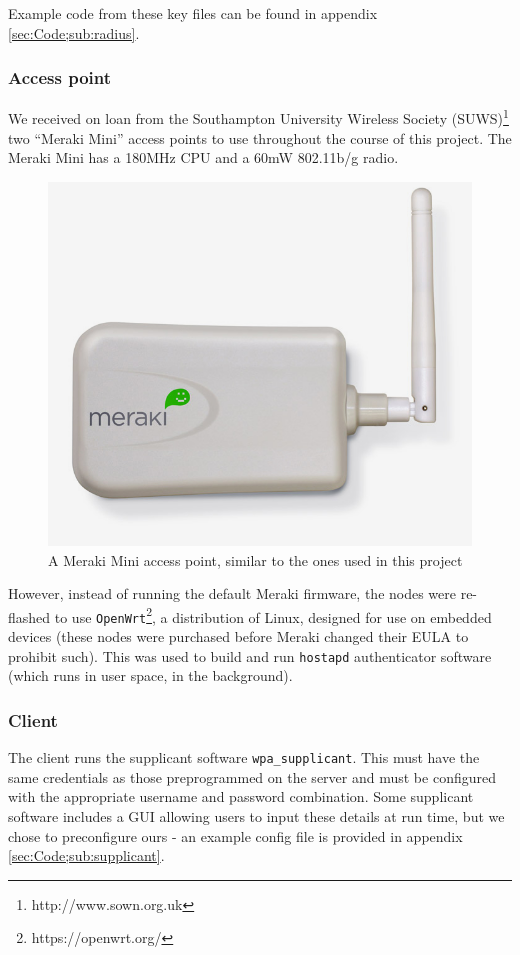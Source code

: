 \documentclass[12pt,a4paper,titlepage]{article}
\begin{document}
Example code from these key files can be found in appendix \ref{sec:Code;sub:radius}.

\subsubsection{Access point}
\label{sec:implementation;sub:components;sub:accesspoint}
We received on loan from the Southampton University Wireless Society (SUWS)\footnote{http://www.sown.org.uk} two ``Meraki Mini'' access points to use throughout the course of this project. The Meraki Mini has a 180MHz CPU and a 60mW 802.11b/g radio.
\begin{figure}[h!]
\centering
\includegraphics[scale=0.3]{./images/meraki-mini.jpg}
\caption{A Meraki Mini access point, similar to the ones used in this project \cite{imagemeraki}}
\end{figure}

However, instead of running the default Meraki firmware, the nodes were re-flashed to use \texttt{OpenWrt}\footnote{https://openwrt.org/}, a distribution of Linux, designed for use on embedded devices (these nodes were purchased before Meraki changed their EULA to prohibit such). This was used to build and run \texttt{hostapd} authenticator software (which runs in user space, in the background).

\subsubsection{Client}
\label{sec:implementation;sub:components;sub:client}
The client runs the supplicant software \texttt{wpa\_supplicant}. This must have the same credentials as those preprogrammed on the server and must be configured with the appropriate username and password combination. Some supplicant software includes a GUI allowing users to input these details at run time, but we chose to preconfigure ours - an example config file is provided in appendix \ref{sec:Code;sub:supplicant}.
\end{document}
